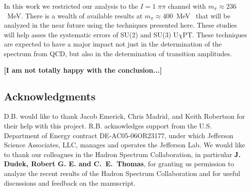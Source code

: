 \documentclass[twocolumn,hyperpdf,
amsmath,amssymb,
aps,prd,10pt,
superscriptaddress,nofootinbib,noeprint,preprintnumbers]{revtex4-1}
\newcommand{\raul}{\bf \color{blue}}
\begin{document}
In this work we restricted our analysis to the $I=1$ $\pi\pi$ channel with $m_\pi\approx236$~MeV. There is a wealth of available results at $m_\pi\approx 400$~MeV~\cite{Dudek:2012xn, Dudek:2010ew, Dudek:2012gj, Dudek:2014qha, Wilson:2014cna} that will be analyzed in the near future using the techniques presented here. These studies will help asses the systematic errors of SU(2) and SU(3) U$\chi$PT. These techniques are expected to have a major impact not just in the determination of the spectrum from QCD, but also in the determination of transition amplitudes.
 
 {\raul [I am not totally happy with the conclusion...]}


\subsection*{Acknowledgments}


D.B. would like to thank Jacob Emerick, Chris Madrid, and Keith Robertson for their help with this project. R.B. acknowledges support from the U.S. Department of Energy contract DE-AC05-06OR23177, under which Jefferson Science Associates, LLC, manages and operates the Jefferson Lab. We would like to thank our colleagues in the Hadron Spectrum Collaboration, in particular {\raul J. Dudek,  Robert G. E. and C.~E.~Thomas}, for granting us permission to analyze the recent results of the Hadron Spectrum Collaboration and for useful discussions and feedback on the manuscript. 




 







\end{document}
